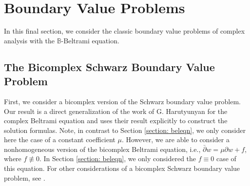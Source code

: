 \documentclass[12pt,reqno]{amsart}
\theoremstyle{definition}
\theoremstyle{remark}
\newcommand{\p}{\partial}
\newcommand{\dbar}{\bar\partial}
\newcommand{\bc}{\mathbb{B}}
\begin{document}
    
    

\section{Boundary Value Problems}\label{section: bvp}

In this final section, we consider the classic boundary value problems of complex analysis with the $\bc$-Beltrami equation. 

\subsection{The Bicomplex Schwarz Boundary Value Problem}

First, we consider a bicomplex version of the Schwarz boundary value problem. Our result is a direct generalization of the work of G. Harutyunyan \cite{BeltramiSchwarz} for the complex Beltrami equation and uses their result explicitly to construct the solution formulas. Note, in contrast to Section \ref{section: beleqn}, we only consider here the case of a constant coefficient $\mu$. However, we are able to consider a nonhomogeneous version of the bicomplex Beltrami equation, i.e., $\dbar w = \mu \p w + f$, where $f \not\equiv 0$. In Section \ref{section: beleqn}, we only considered the $f \equiv 0$ case of this equation. For other considerations of a bicomplex Schwarz boundary value problem, see \cite{BCSchwarz}.
\end{document}
